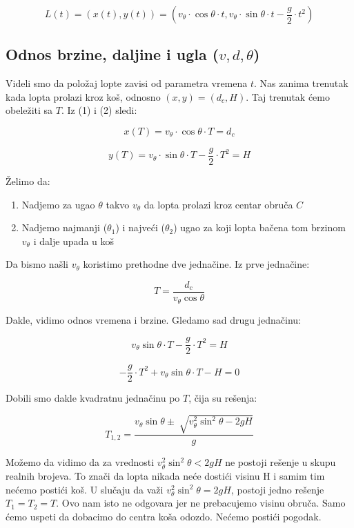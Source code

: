 \documentclass[a4paper, 12pt]{article}
\begin{document}
\[L(t) = (x(t), y(t)) = (v_\theta \cdot \cos \theta \cdot t, v_\theta \cdot \sin \theta \cdot t - \dfrac{g}{2} \cdot t^2)\]

\subsection{Odnos brzine, daljine i ugla ($v, d, \theta$)}

Videli smo da položaj lopte zavisi od parametra vremena $t$. Nas zanima trenutak kada lopta prolazi kroz koš, odnosno $(x,y) = (d_c,H)$. Taj trenutak ćemo obeležiti sa $T$. Iz (1) i (2) sledi:

\[x(T) = v_\theta \cdot \cos \theta \cdot T = d_c\]

\[y(T) = v_{\theta} \cdot \sin \theta \cdot T - \dfrac{g}{2} \cdot T^2 = H\]


Želimo da:

\begin{enumerate}
\item Nadjemo za ugao $\theta$ takvo $v_{\theta}$ da lopta prolazi kroz centar obruča $C$
\item Nadjemo najmanji ($\theta_1$) i najveći ($\theta_2$) ugao za koji lopta bačena tom brzinom $v_{\theta}$ i dalje upada u koš
\end{enumerate}

Da bismo našli $v_{\theta}$ koristimo prethodne dve jednačine. Iz prve jednačine:

\begin{equation}
T = \dfrac{d_c}{v_\theta \cos \theta}
\end{equation}

Dakle, vidimo odnos vremena i brzine. Gledamo sad drugu jednačinu:

\[v_{\theta} \sin \theta \cdot T - \dfrac{g}{2} \cdot T^2 = H\]

\[- \dfrac{g}{2} \cdot T^2 + v_{\theta} \sin \theta \cdot T - H = 0\]

Dobili smo dakle kvadratnu jednačinu po $T$, čija su rešenja:

\[T_{1,2} = \dfrac{v_{\theta} \sin \theta \pm \sqrt[]{v_{\theta}^2 \sin^2 \theta - 2 g H}}{g}\]

Možemo da vidimo da za vrednosti ${v_{\theta}^2 \sin^2 \theta < 2 g H}$ ne postoji rešenje u skupu realnih brojeva. To znači da lopta nikada neće dostići visinu H i samim tim nećemo postići koš.
U slučaju da važi ${v_{\theta}^2 \sin^2 \theta = 2 g H}$, postoji jedno rešenje $T_1 = T_2 = T$. Ovo nam isto ne odgovara jer ne prebacujemo visinu obruča. Samo ćemo uspeti da dobacimo do centra koša odozdo. Nećemo postići pogodak.
\end{document}
